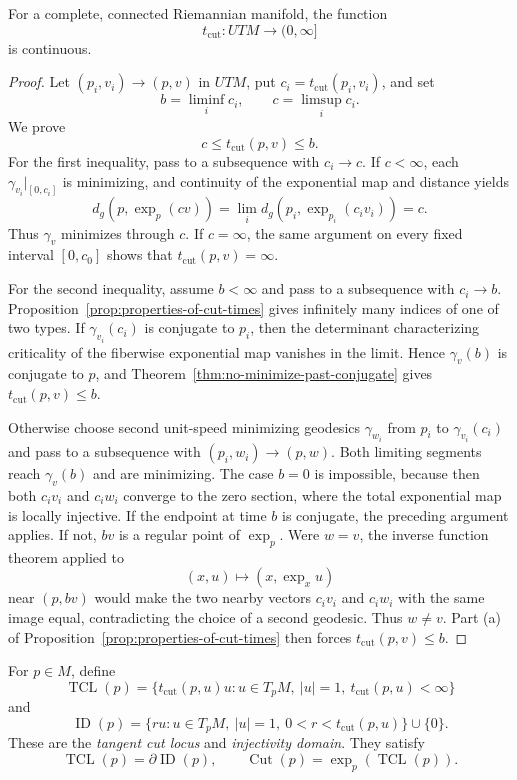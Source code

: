 \begin{theorem}
\label{thm:cut-time-continuous}

For a complete, connected Riemannian manifold, the function
\[
t_{\mathrm{cut}}\colon UTM\longrightarrow(0,\infty]
\]
is continuous.

\begin{proof}
\sketch Let $(p_i,v_i)\to(p,v)$ in $UTM$, put
$c_i=t_{\mathrm{cut}}(p_i,v_i)$, and set
\[
b=\liminf_i c_i,
\qquad c=\limsup_i c_i.
\]
We prove
\[
c\leq t_{\mathrm{cut}}(p,v)\leq b.
\]
For the first inequality, pass to a subsequence with $c_i\to c$. If
$c<\infty$, each $\gamma_{v_i}|_{[0,c_i]}$ is minimizing, and continuity of
the exponential map and distance yields
\[
d_g(p,\exp_p(cv))
=\lim_i d_g(p_i,\exp_{p_i}(c_iv_i))
=c.
\]
Thus $\gamma_v$ minimizes through $c$. If $c=\infty$, the same argument on
every fixed interval $[0,c_0]$ shows that $t_{\mathrm{cut}}(p,v)=\infty$.

For the second inequality, assume $b<\infty$ and pass to a subsequence with
$c_i\to b$. Proposition~\ref{prop:properties-of-cut-times} gives infinitely
many indices of one of two types. If $\gamma_{v_i}(c_i)$ is conjugate to $p_i$,
then the determinant characterizing criticality of the fiberwise exponential
map vanishes in the limit. Hence $\gamma_v(b)$ is conjugate to $p$, and
Theorem~\ref{thm:no-minimize-past-conjugate} gives
$t_{\mathrm{cut}}(p,v)\leq b$.

Otherwise choose second unit-speed minimizing geodesics
$\gamma_{w_i}$ from $p_i$ to $\gamma_{v_i}(c_i)$ and pass to a subsequence
with $(p_i,w_i)\to(p,w)$. Both limiting segments reach $\gamma_v(b)$ and are
minimizing. The case $b=0$ is impossible, because then both $c_iv_i$ and
$c_iw_i$ converge to the zero section, where the total exponential map is
locally injective. If the endpoint at time $b$ is conjugate, the preceding
argument applies. If not, $bv$ is a regular point of $\exp_p$. Were $w=v$,
the inverse function
theorem applied to
\[
(x,u)\longmapsto(x,\exp_xu)
\]
near $(p,bv)$ would make the two nearby vectors $c_iv_i$ and $c_iw_i$ with
the same image equal, contradicting the choice of a second geodesic. Thus
$w\ne v$. Part (a) of Proposition~\ref{prop:properties-of-cut-times} then
forces $t_{\mathrm{cut}}(p,v)\leq b$.
\end{proof}
\end{theorem}

For $p\in M$, define
\[
\operatorname{TCL}(p)
=\{t_{\mathrm{cut}}(p,u)u:
u\in T_pM,\ |u|=1,\ t_{\mathrm{cut}}(p,u)<\infty\}
\]
and
\[
\operatorname{ID}(p)
=\{ru:u\in T_pM,\ |u|=1,\ 0<r<t_{\mathrm{cut}}(p,u)\}\cup\{0\}.
\]
These are the \emph{tangent cut locus} and \emph{injectivity domain}. They
satisfy
\[
\operatorname{TCL}(p)=\partial\operatorname{ID}(p),
\qquad
\operatorname{Cut}(p)=\exp_p(\operatorname{TCL}(p)).
\]

